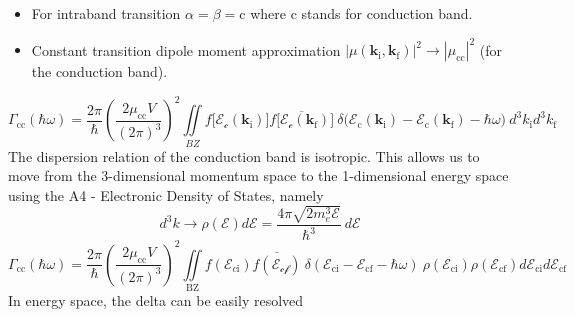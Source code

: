 \begin{itemize}
  \item For intraband transition $\alpha=\beta=\text{c}$ where $\text{c}$ stands for conduction band.
  \item Constant transition dipole moment approximation $|\mu(\mathbf{k}_{\text{i}},\mathbf{k}_{\text{f}})|^{2}\to|\mu_{\text{cc}}|^{2}$ (for the conduction band).
\end{itemize}
\begin{equation}
\Gamma_{\text{cc}}(\hbar\omega) = \frac{2\pi}{\hbar}\left( \frac{2\mu_{\text{cc}}V}{(2\pi)^{3}} \right)^{2} \iint\limits_{BZ} f\Big[\mathcal{E_{\text{c}}}(\mathbf{k}_{\text{i}})  \Big]\overline{f\Big[\mathcal{E_{\text{c}}}(\mathbf{k}_{\text{f}})  \Big]} \ \delta \Big( \mathcal{E}_{\text{c}}(\mathbf{k}_{\text{i}}) - \mathcal{E}_{\text{c}}(\mathbf{k}_{\text{f}}) - \hbar\omega \Big) \ d^{3}k_{\text{i}}d^{3}k_{\text{f}}
\label{eq:gamma_cc_momentum_space}
\end{equation}
The dispersion relation of the conduction band is isotropic. This allows us to move from the 3-dimensional momentum space to the 1-dimensional energy space using the A4 - Electronic Density of States, namely
\begin{equation}
d^{3}k\to \rho(\mathcal{E})d\mathcal{E} = \frac{4\pi \sqrt{2m_{e}^{3}\mathcal{E}}}{\hbar^3} \ d\mathcal{E}
\label{eq:dos_measure_free_electron}
\end{equation}
\begin{equation}
\Gamma_{\text{cc}}(\hbar\omega) = \frac{2\pi}{\hbar}\left( \frac{2\mu_{\text{cc}}V}{(2\pi)^{3}} \right)^{2} \iint\limits_{\text{BZ}} f(\mathcal{E}_{c\text{i}})\overline{f(\mathcal{E_{\text{cf}}})}  \ \delta(\mathcal{E}_{\text{ci}}-\mathcal{E}_{\text{cf}}-\hbar\omega) \ \rho(\mathcal{E}_{\text{ci}}) \rho(\mathcal{E}_{\text{cf}})d\mathcal{E}_{\text{ci}}d\mathcal{E}_{\text{cf}}
\label{eq:gamma_cc_energy_double}
\end{equation}
In energy space, the delta can be easily resolved

